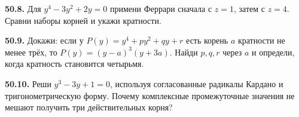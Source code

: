 \noindent\begin{minipage}[t]{\linewidth}\textbf{50.8.}\starmark{} Для \(y^4-3y^2+2y=0\) примени Феррари сначала с \(z=1\), затем с \(z=4\). Сравни наборы корней и укажи кратности.\par\end{minipage}\par
\noindent\begin{minipage}[t]{\linewidth}\textbf{50.9.} Докажи: если у \(P(y)=y^4+py^2+qy+r\) есть корень \(a\) кратности не менее трёх, то \(P(y)=(y-a)^3(y+3a)\). Найди \(p,q,r\) через \(a\) и определи, когда кратность становится четырьмя.\par\end{minipage}\par
\noindent\begin{minipage}[t]{\linewidth}\textbf{50.10.}\starmark{} Реши \(y^3-3y+1=0\), используя согласованные радикалы Кардано и тригонометрическую форму. Почему комплексные промежуточные значения не мешают получить три действительных корня?\par\end{minipage}\par
\endgroup
